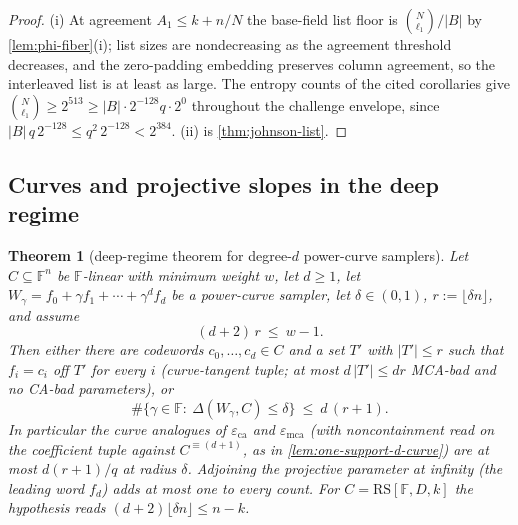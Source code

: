 \documentclass[11pt]{article}
\newtheorem{theorem}{Theorem}[section]
\theoremstyle{definition}
\theoremstyle{remark}
\newcommand{\F}{\mathbb{F}}
\newcommand{\B}{B}
\newcommand{\RS}{\mathrm{RS}}
\newcommand{\eca}{\varepsilon_{\mathrm{ca}}}
\newcommand{\emca}{\varepsilon_{\mathrm{mca}}}
\newcommand{\dist}{\Delta}
\begin{document}
\begin{proof}
(i) At agreement $A_1\le k+n/N$ the base-field list floor is $\binom N{\ell_1}/|\B|$ by \cref{lem:phi-fiber}\textup{(i)}; list sizes are nondecreasing as the agreement threshold decreases, and the zero-padding embedding preserves column agreement, so the interleaved list is at least as large. The entropy counts of the cited corollaries give $\binom N{\ell_1}\ge2^{513}\ge|\B|\cdot2^{-128}q\cdot2^{0}$ throughout the challenge envelope, since $|\B|\,q\,2^{-128}\le q^2\,2^{-128}<2^{384}$. (ii) is \cref{thm:johnson-list}.
\end{proof}

\subsection{Curves and projective slopes in the deep regime}\label{sec:discharge-T5}

\begin{theorem}[deep-regime theorem for degree-$d$ power-curve samplers]\label{thm:deep-curve}
Let $C\subseteq\F^n$ be $\F$-linear with minimum weight $w$, let $d\ge1$, let $W_\gamma=f_0+\gamma f_1+\cdots+\gamma^df_d$ be a power-curve sampler, let $\delta\in(0,1)$, $r:=\lfloor\delta n\rfloor$, and assume
\[
(d+2)\,r\ \le\ w-1 .
\]
Then either there are codewords $c_0,\dots,c_d\in C$ and a set $T'$ with $|T'|\le r$ such that $f_i=c_i$ off $T'$ for every $i$ \textup(curve-tangent tuple; at most $d\,|T'|\le dr$ MCA-bad and no CA-bad parameters\textup), or
\[
\#\{\gamma\in\F:\ \dist(W_\gamma,C)\le\delta\}\ \le\ d\,(r+1).
\]
In particular the curve analogues of $\eca$ and $\emca$ \textup(with noncontainment read on the coefficient tuple against $C^{\equiv(d+1)}$, as in \cref{lem:one-support-d-curve}\textup) are at most $d(r+1)/q$ at radius $\delta$. Adjoining the projective parameter at infinity \textup(the leading word $f_d$\textup) adds at most one to every count. For $C=\RS[\F,D,k]$ the hypothesis reads $(d+2)\lfloor\delta n\rfloor\le n-k$.
\end{theorem}
\end{document}
